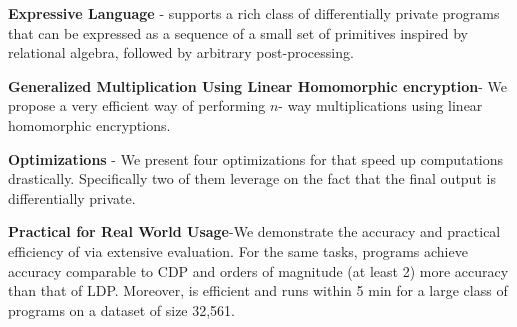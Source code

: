 	\item \textbf{Expressive Language} - \system supports a rich class of differentially private programs that can be expressed as a sequence of a small set of \system primitives inspired by relational algebra, followed by arbitrary post-processing. %
	\item \textbf{Generalized Multiplication Using Linear Homomorphic encryption}- We propose a very efficient way of performing $n$- way multiplications using linear homomorphic encryptions.
	\item \textbf{Optimizations} - We present four optimizations for \system that speed up computations  drastically. Specifically two of them leverage on the fact that the final output is differentially private. 
	\item \textbf{Practical for Real World Usage}-We demonstrate the accuracy and practical efficiency of \system via extensive  evaluation. For the same tasks, \system programs achieve accuracy comparable to \textsf{CDP} and orders of magnitude (at least 2) more accuracy than that of \textsf{LDP}. Moreover, \system is efficient and runs within 5 min for a large class of programs on a dataset of size 32,561. 
\squishend




